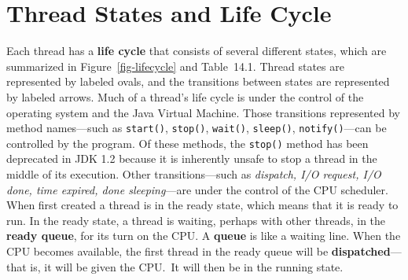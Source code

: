 \section{Thread States and Life Cycle}
\label{thread-statesand-life-cycle}
\noindent Each thread has a {\bf life cycle} that
consists of several different states, which are summarized in
Figure~\ref{fig-lifecycle} and Table~14.1.  Thread states are
represented by labeled ovals, and the transitions between states are
represented by labeled arrows. Much
of a thread's life cycle is under the control of the operating system
and the Java Virtual \mbox{Machine.}  Those transitions represented by method names---such as
{\tt start()}, {\tt stop()}, {\tt wait()}, {\tt sleep()}, {\tt notify()}---can be controlled
by the program.  Of these methods, the {\tt stop()} method has been
deprecated in JDK 1.2 because it is inherently unsafe to stop a thread
in the middle of its execution.  Other transitions---such as {\it dispatch, I/O
request, I/O done, time expired, done sleeping}---are under the
control of the CPU scheduler. When first created a thread is in the
ready state, which means that it is ready to run.   In the ready state,
a thread is waiting, perhaps with other threads, in the 
{\bf ready queue}, 
for its turn on the CPU.  A {\bf queue} is like a waiting
line.  When the CPU becomes available, the first thread in the ready
queue will be {\bf dispatched}---that is, it will be given the
CPU.~It will then be in the running state.

